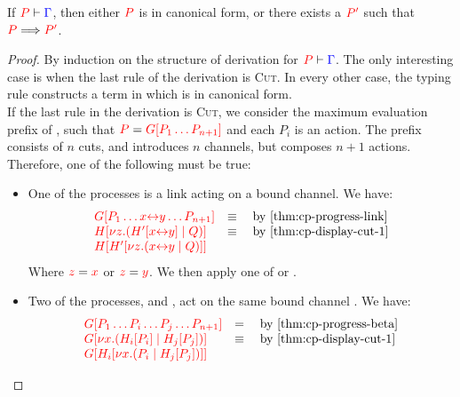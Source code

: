 \begin{theorem}[Progress]\label{thm:cp-progress-3}
  If $\seq[{ P }]{ \Gamma }$, then either $\tm{P}$ is in canonical form, or
  there exists a $\tm{P'}$ such that $\reducesto{P}{P'}$. 
\end{theorem}
\begin{proof}
  By induction on the structure of derivation for $\seq[{ P }]{ \Gamma }$.
  The only interesting case is when the last rule of the derivation is
  \textsc{Cut}. In every other case, the typing rule constructs a term in which
  is in canonical form. 
  \\
  If the last rule in the derivation is \textsc{Cut}, we consider the maximum
  evaluation prefix  of , such that $\tm{P} = \tm{\cpPlug{G}{P_1
  \dots P_{n+1}}}$ and each $P_i$ is an action.
  The prefix  consists of $n$ cuts, and introduces $n$ channels, but
  composes $n+1$ actions. Therefore, one of the following must be true:
  \begin{itemize}
  \item
    One of the processes is a link  acting on a bound channel.
    We have:
    \begin{gather*}
      \begin{array}{ll}
        \tm{\cpPlug{G}{P_1 \dots \cpLink{x}{y} \dots P_{n+1}}}
        & \equiv \quad \text{by \cref{thm:cp-progress-link}}
        \\
        \tm{\cpPlug{H}{\cpCut{z}{\cpPlug{H'}{\cpLink{x}{y}}}{Q}}}
        & \equiv \quad \text{by \cref{thm:cp-display-cut-1}}
        \\
        \tm{\cpPlug{H}{\cpPlug{H'}{\cpCut{z}{\cpLink{x}{y}}{Q}}}}
      \end{array}
    \end{gather*}
    Where $\tm{z} = \tm{x}$ or $\tm{z} = \tm{y}$.
    We then apply one of  or .
  \item
    Two of the processes,  and , act on the same bound channel
    . We have:
    \begin{gather*}
      \begin{array}{ll}
        \tm{\cpPlug{G}{P_1 \dots P_i \dots P_j \dots P_{n+1}}}
        & = \quad \text{by \cref{thm:cp-progress-beta}}
        \\
        \tm{\cpPlug{G}{\cpCut{x}{\cpPlug{H_i}{P_i}}{\cpPlug{H_j}{P_j}}}}
        & \equiv \quad \text{by \cref{thm:cp-display-cut-1}} 
        \\
        \tm{\cpPlug{G}{\cpPlug{H_i}{\cpCut{x}{P_i}{\cpPlug{H_j}{P_j}}}}}

\end{array}
\end{gather*}
\end{itemize}
\end{proof}
